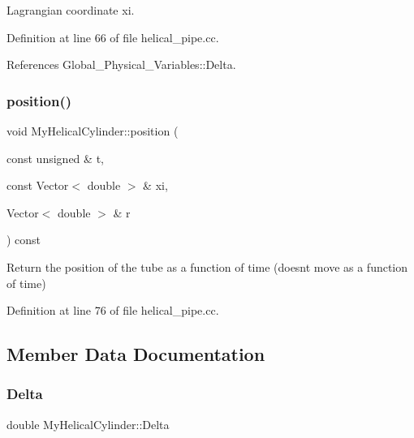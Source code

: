Lagrangian coordinate xi. 



Definition at line 66 of file helical\+\_\+pipe.\+cc.



References Global\+\_\+\+Physical\+\_\+\+Variables\+::\+Delta.

\mbox{\label{classMyHelicalCylinder_ae35db6b394ce561acfda83a61b678ff5}} 
\subsubsection{\texorpdfstring{position()}{position()}\hspace{0.1cm}{\footnotesize\ttfamily [2/2]}}
{\footnotesize\ttfamily void My\+Helical\+Cylinder\+::position (\begin{DoxyParamCaption}\item[{const unsigned \&}]{t,  }\item[{const Vector$<$ double $>$ \&}]{xi,  }\item[{Vector$<$ double $>$ \&}]{r }\end{DoxyParamCaption}) const\hspace{0.3cm}{\ttfamily [inline]}}

Return the position of the tube as a function of time (doesn\textquotesingle{}t move as a function of time) 

Definition at line 76 of file helical\+\_\+pipe.\+cc.



\subsection{Member Data Documentation}
\mbox{\label{classMyHelicalCylinder_a104c0949848d76adefb15d050853c5f0}} 
\subsubsection{\texorpdfstring{Delta}{Delta}}
{\footnotesize\ttfamily double My\+Helical\+Cylinder\+::\+Delta\hspace{0.3cm}{\ttfamily [private]}}



